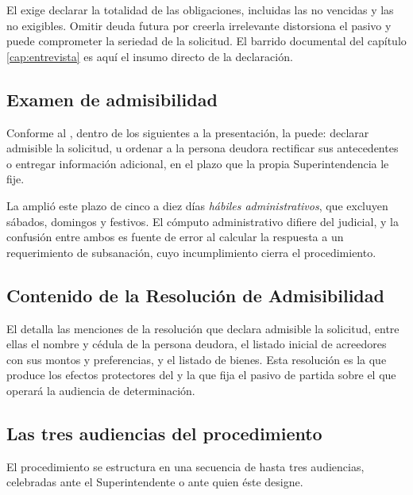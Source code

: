 \begin{alerta}
El  exige declarar la totalidad de las obligaciones, incluidas las no vencidas y
las no exigibles. Omitir deuda futura por creerla irrelevante distorsiona el pasivo y puede
comprometer la seriedad de la solicitud. El barrido documental del capítulo
\ref{cap:entrevista} es aquí el insumo directo de la declaración.
\end{alerta}

\subsection{Examen de admisibilidad}

Conforme al , dentro de los 
siguientes a la presentación, la \superir{} puede: declarar admisible la solicitud, u
ordenar a la persona deudora rectificar sus antecedentes o entregar información adicional,
en el plazo que la propia Superintendencia le fije.

\begin{foco}
La \Lreforma{} amplió este plazo de cinco a diez días \emph{hábiles administrativos}, que
excluyen sábados, domingos y festivos. El cómputo administrativo difiere del judicial, y la
confusión entre ambos es fuente de error al calcular la respuesta a un requerimiento de
subsanación, cuyo incumplimiento cierra el procedimiento.
\end{foco}

\subsection{Contenido de la Resolución de Admisibilidad}

El  detalla las menciones de la resolución que declara admisible la solicitud,
entre ellas el nombre y cédula de la persona deudora, el listado inicial de acreedores con
sus montos y preferencias, y el listado de bienes. Esta resolución es la que produce los
efectos protectores del  y la que fija el pasivo de partida sobre el que operará
la audiencia de determinación.

\subsection{Las tres audiencias del procedimiento}

El procedimiento se estructura en una secuencia de hasta tres audiencias, celebradas ante
el Superintendente o ante quien éste designe.

